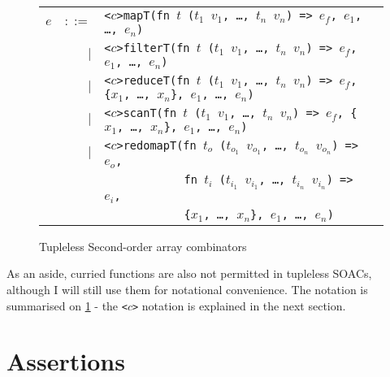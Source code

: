 \begin{figure}[bt]
\begin{tabular}{lrll}
$e$ & $::=$ & \texttt{<$c$>mapT(fn $t$ ($t_{1}$ $v_{1}$, \ldots, $t_{n}$ $v_{n}$) => $e_f$, $e_{1}$, \ldots, $e_{n}$)} \\
    & $|$ & \texttt{<$c$>filterT(fn $t$ ($t_{1}$ $v_{1}$, \ldots, $t_{n}$ $v_{n}$) => $e_f$, $e_{1}$, \ldots, $e_{n}$)} \\
    & $|$ & \texttt{<$c$>reduceT(fn $t$ ($t_{1}$ $v_{1}$, \ldots, $t_{n}$ $v_{n}$) => $e_f$, \{$x_{1}$, \ldots, $x_{n}$\}, $e_{1}$, \ldots, $e_{n}$)} \\
    & $|$ & \texttt{<$c$>scanT(fn $t$ ($t_{1}$ $v_{1}$, \ldots, $t_{n}$ $v_{n}$) => $e_f$, \{$x_{1}$, \ldots, $x_{n}$\}, $e_{1}$, \ldots, $e_{n}$)} \\
    & $|$ & \texttt{<$c$>redomapT(fn $t_{o}$ ($t_{o_{1}}$ $v_{o_{1}}$, \ldots, $t_{o_{n}}$ $v_{o_{n}}$) => $e_o$,} \\
    &     & \texttt{\ \ \ \ \ \ \ \ \ \ \ \ fn $t_{i}$ ($t_{i_{1}}$ $v_{i_{1}}$, \ldots, $t_{i_{n}}$ $v_{i_{n}}$) => $e_i$,} \\
    &     & \texttt{\ \ \ \ \ \ \ \ \ \ \ \ \{$x_{1}$, \ldots, $x_{n}$\}, $e_{1}$, \ldots, $e_{n}$)} \\
\end{tabular}
\caption{Tupleless Second-order array combinators}
\label{fig:tupleless-soacs}
\end{figure}

As an aside, curried functions are also not permitted in tupleless
SOACs, although I will still use them for notational convenience.  The
notation is summarised on \cref{fig:tupleless-soacs} - the
\texttt{<$c$>} notation is explained in the next section.

\section{Assertions}
\label{sec:assertions}

